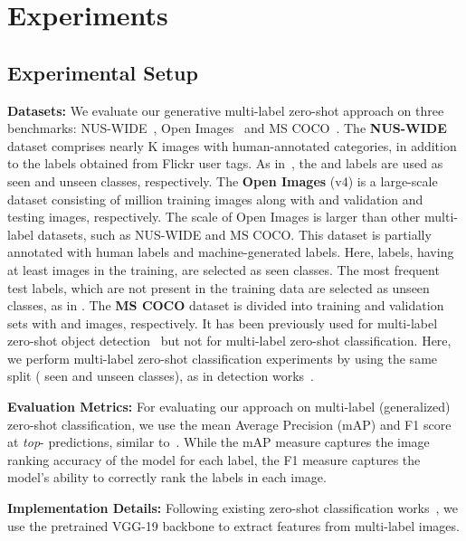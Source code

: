 \documentclass[final]{cvpr}
\begin{document}
\section{Experiments}

\subsection{Experimental Setup\label{sec:exp_setup}}
\noindent\textbf{Datasets:} We evaluate our generative multi-label zero-shot approach on three benchmarks: NUS-WIDE~\cite{nuswide}, Open Images~\cite{openimages} and MS COCO~\cite{coco}.
The \textbf{NUS-WIDE} dataset comprises nearly K images with  human-annotated categories, in addition to the  labels obtained from Flickr user tags. As in~\cite{huynh2020shared,zhang2016fast}, the  and  labels are used as seen and unseen classes, respectively. 
The \textbf{Open Images} (v4) is a large-scale dataset consisting of  million training images along with  and  validation and testing images, respectively. The scale of Open Images is larger than other multi-label
datasets, such as NUS-WIDE and MS COCO. This dataset is partially annotated with human labels and machine-generated labels. Here,  labels, having at least  images in the training, are selected as seen classes. The most frequent  test labels, which are not present in the training data are selected as unseen classes, as in \cite{huynh2020shared}. 
The \textbf{MS COCO} dataset is divided into training and validation sets with  and  images, respectively. It has been previously used for multi-label zero-shot object detection~\cite{bansal2018zero,hayat2020synthesizing} but not for multi-label zero-shot classification. Here, we perform multi-label zero-shot classification experiments by using the same split ( seen and  unseen classes), as in detection works~\cite{bansal2018zero,hayat2020synthesizing}.

\noindent\textbf{Evaluation Metrics:}
For evaluating our approach on multi-label (generalized) zero-shot classification, we use the mean Average Precision (mAP) and F1 score at \textit{top}- predictions, similar to~\cite{huynh2020shared,veit2017learning,zhang2016fast}. While the mAP measure captures the image ranking accuracy of the model for each label, the F1 measure captures the model's ability to correctly rank the labels in each image. 

\noindent\textbf{Implementation Details:}
Following existing zero-shot classification works~\cite{zhang2016fast,huynh2020shared}, we use the pretrained VGG-19 backbone to extract features from multi-label images.
\end{document}
